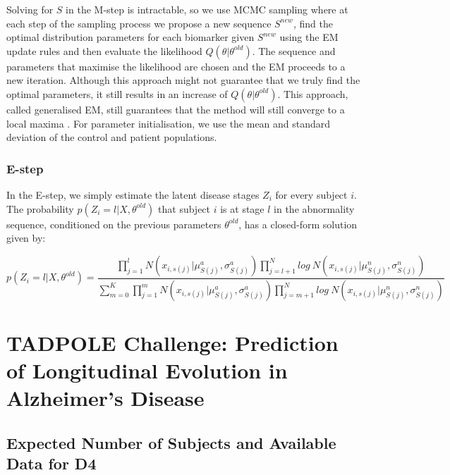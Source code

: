 Solving for $S$ in the M-step is intractable, so we use MCMC sampling where at each step of the sampling process we propose a new sequence $S^{new}$, find the optimal distribution parameters for each biomarker given $S^{new}$ using the EM update rules and then evaluate the likelihood $Q(\theta | \theta^{old})$. The sequence and parameters that maximise the likelihood are chosen and the EM proceeds to a new iteration. Although this approach might not guarantee that we truly find the optimal parameters, it still results in an increase of $Q(\theta | \theta^{old})$. This approach, called generalised EM, still guarantees that the method will still converge to a local maxima \cite{bishop2007pattern}. For parameter initialisation, we use the mean and standard deviation of the control and patient populations. 

\subsection{E-step}

In the E-step, we simply estimate the latent disease stages $Z_i$ for every subject $i$. The probability $p(Z_i = l|X, \theta^{old})$ that subject $i$ is at stage $l$ in the abnormality sequence, conditioned on the previous parameters $\theta^{old}$, has a closed-form solution given by:

\begin{equation}
p(Z_i = l|X, \theta^{old}) = \frac{\prod_{j=1}^{l} N(x_{i,s(j)}|\mu_{S(j)}^a, \sigma_{S(j)}^a)\prod_{j=l + 1}^N log\ N(x_{i,s(j)}|\mu_{S(j)}^n, \sigma_{S(j)}^n)}{\sum_{m=0}^K \prod_{j=1}^{m} N(x_{i,s(j)}|\mu_{S(j)}^a, \sigma_{S(j)}^a)\prod_{j=m + 1}^N log\ N(x_{i,s(j)}|\mu_{S(j)}^n, \sigma_{S(j)}^n) }
\end{equation}

\chapter[TADPOLE Challenge: Prediction of Longitudinal Evolution in AD]{TADPOLE Challenge: Prediction of Longitudinal Evolution in Alzheimer's Disease}

\section{Expected Number of Subjects and Available Data for D4}
\label{app:expectedD4}

